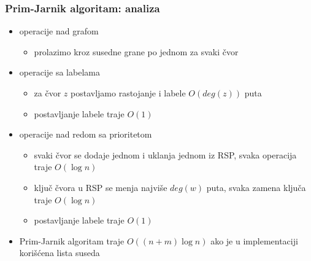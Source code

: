 \documentclass[compress,aspectratio=169]{beamer}
\begin{document}
\begin{frame}[fragile]
  \frametitle{Prim-Jarnik algoritam: analiza}
  \begin{itemize}
    \item operacije nad grafom
    \begin{itemize}
      \item prolazimo kroz susedne grane po jednom za svaki čvor
    \end{itemize}
    \item operacije sa labelama
    \begin{itemize}
      \item za čvor $z$ postavljamo rastojanje i labele $O(deg(z))$ puta
      \item postavljanje labele traje $O(1)$
    \end{itemize}
    \item operacije nad redom sa prioritetom
    \begin{itemize}
      \item svaki čvor se dodaje jednom i uklanja jednom iz RSP, svaka 
        operacija traje $O(\log n)$
      \item ključ čvora u RSP se menja najviše $deg(w)$ puta, svaka 
        zamena ključa traje $O(\log n)$
      \item postavljanje labele traje $O(1)$
    \end{itemize}
    \item Prim-Jarnik algoritam traje $O((n+m)\log n)$ ako je u 
      implementaciji korišćena lista suseda
  \end{itemize}
\end{frame}
\end{document}
